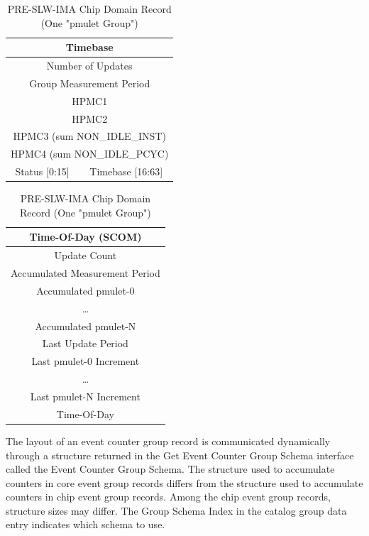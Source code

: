 \documentclass[14]{article}
\begin{document}
\begin{table}
  \parbox{.45\linewidth}{
    \centering
    \begin{tabular}[l]{|c|c|}
      \hline
      \multicolumn{2}{|c|}{Timebase} \\ \hline
      \multicolumn{2}{|c|}{Number of Updates} \\ \hline
      \multicolumn{2}{|c|}{Group Measurement Period} \\ \hline
      \multicolumn{2}{|c|}{HPMC1} \\ \hline
      \multicolumn{2}{|c|}{HPMC2} \\ \hline
      \multicolumn{2}{|c|}{HPMC3 (sum NON\_IDLE\_INST)} \\ \hline
      \multicolumn{2}{|c|}{HPMC4 (sum NON\_IDLE\_PCYC)} \\ \hline
      Status [0:15] & Timebase [16:63] \\
      \hline
    \end{tabular}
    \caption{HPMC-IMA Core Domain Record (One "HPMC Group")}
  }
  \hfill
  \parbox{.45\linewidth}{
    \centering
    \begin{tabular}[l]{|c|}
      \hline
      Time-Of-Day (SCOM) \\ \hline
      Update Count \\ \hline
      Accumulated Measurement Period \\ \hline
      Accumulated pmulet-0 \\ \hline
      \dots \\ \hline
      Accumulated pmulet-N \\ \hline
      Last Update Period \\ \hline
      Last pmulet-0 Increment \\ \hline
      \dots \\ \hline
      Last pmulet-N Increment \\ \hline
      Time-Of-Day \\ \hline
    \end{tabular}
    \caption{PRE-SLW-IMA Chip Domain Record (One "pmulet Group")}
  }
\end{table}

The layout of an event counter group record is communicated dynamically through
a structure returned in the Get Event Counter Group Schema interface called the
Event Counter Group Schema. The structure used to accumulate counters in core
event group records differs from the structure used to accumulate counters in
chip event group records. Among the chip event group records, structure sizes
may differ. The Group Schema Index in the catalog group data entry indicates
which schema to use.
\end{document}
